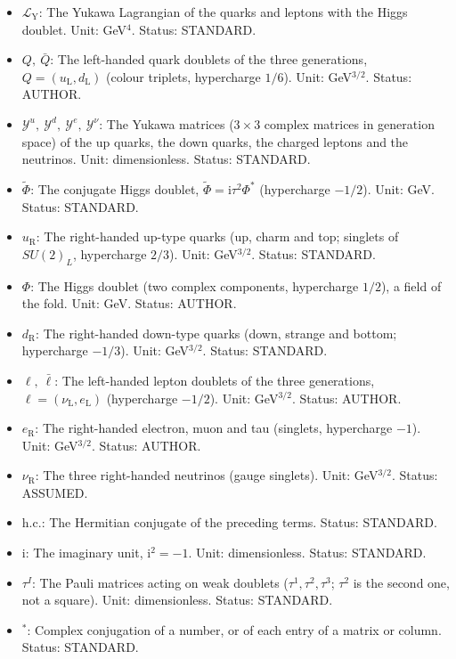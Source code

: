 \documentclass[
  10pt,
]{article}
\providecommand{\tightlist}{%
  \setlength{\itemsep}{0pt}\setlength{\parskip}{0pt}}
\begin{document}
\begin{itemize}
\tightlist
\item
  \(\mathcal{L}_{\mathrm{Y}}\): The Yukawa Lagrangian of the quarks and
  leptons with the Higgs doublet. Unit: GeV\(^4\). Status: STANDARD.
\item
  \(Q,\ \bar Q\): The left-handed quark doublets of the three
  generations, \(Q = (u_{\mathrm{L}}, d_{\mathrm{L}})\) (colour
  triplets, hypercharge \(1/6\)). Unit: GeV\(^{3/2}\). Status: AUTHOR.
\item
  \(\mathcal{Y}^{u},\ \mathcal{Y}^{d},\ \mathcal{Y}^{e},\ \mathcal{Y}^{\nu}\):
  The Yukawa matrices (\(3 \times 3\) complex matrices in generation
  space) of the up quarks, the down quarks, the charged leptons and the
  neutrinos. Unit: dimensionless. Status: STANDARD.
\item
  \(\tilde\Phi\): The conjugate Higgs doublet,
  \(\tilde\Phi = \mathrm{i}\tau^2\Phi^*\) (hypercharge \(-1/2\)). Unit:
  GeV. Status: STANDARD.
\item
  \(u_{\mathrm{R}}\): The right-handed up-type quarks (up, charm and
  top; singlets of \(SU(2)_L\), hypercharge \(2/3\)). Unit:
  GeV\(^{3/2}\). Status: STANDARD.
\item
  \(\Phi\): The Higgs doublet (two complex components, hypercharge
  \(1/2\)), a field of the fold. Unit: GeV. Status: AUTHOR.
\item
  \(d_{\mathrm{R}}\): The right-handed down-type quarks (down, strange
  and bottom; hypercharge \(-1/3\)). Unit: GeV\(^{3/2}\). Status:
  STANDARD.
\item
  \(\ell,\ \bar\ell\): The left-handed lepton doublets of the three
  generations, \(\ell = (\nu_{\mathrm{L}}, e_{\mathrm{L}})\)
  (hypercharge \(-1/2\)). Unit: GeV\(^{3/2}\). Status: AUTHOR.
\item
  \(e_{\mathrm{R}}\): The right-handed electron, muon and tau (singlets,
  hypercharge \(-1\)). Unit: GeV\(^{3/2}\). Status: AUTHOR.
\item
  \(\nu_{\mathrm{R}}\): The three right-handed neutrinos (gauge
  singlets). Unit: GeV\(^{3/2}\). Status: ASSUMED.
\item
  \(\mathrm{h.c.}\): The Hermitian conjugate of the preceding terms.
  Status: STANDARD.
\item
  \(\mathrm{i}\): The imaginary unit, \(\mathrm{i}^2 = -1\). Unit:
  dimensionless. Status: STANDARD.
\item
  \(\tau^I\): The Pauli matrices acting on weak doublets
  (\(\tau^1, \tau^2, \tau^3\); \(\tau^2\) is the second one, not a
  square). Unit: dimensionless. Status: STANDARD.
\item
  \({}^*\): Complex conjugation of a number, or of each entry of a
  matrix or column. Status: STANDARD.
\end{itemize}
\end{document}
